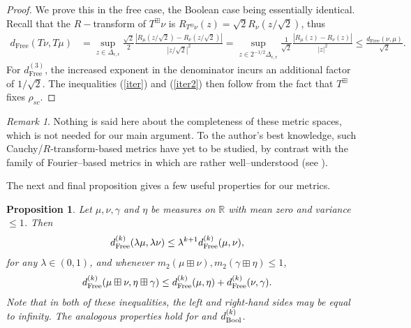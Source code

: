 \documentclass{amsart}
\newtheorem{proposition}[theorem]{Proposition}
\theoremstyle{definition}
\theoremstyle{remark}
\newtheorem{remark}[theorem]{Remark}
\numberwithin{equation}{section}
\begin{document}
\begin{proof} We prove this in the free case, the Boolean case being essentially identical. Recall that the $R-$transform of $T^{\boxplus}\nu$ is $R_{T^{\boxplus}\nu}(z)=\sqrt{2}R_\nu(z/\sqrt{2})$, thus
    \begin{align*}
        d_{\text{Free}}(T\nu, T\mu)&= \sup_{z\in \Delta_{\epsilon,\epsilon}}\frac{\sqrt{2}}{2}\frac{|R_\mu(z/\sqrt{2})-R_\nu(z/\sqrt{2})|}{|z/\sqrt{2}|^2}= \sup_{z\in {2}^{-1/2}\Delta_{\epsilon,\epsilon}}\frac{1}{\sqrt{2}}\frac{|R_\mu(z)-R_\nu(z)|}{|z|^2}\leq\frac{d_{\text{Free}}(\nu, \mu)}{\sqrt{2}}.
    \end{align*}
    For $d^{(3)}_{\text{Free}}$, the increased exponent in the denominator incurs an additional factor of $1/\sqrt{2}$.
    The inequalities (\ref{iter}) and (\ref{iter2}) then follow from the fact that $T^{\boxplus}$ fixes $\rho_{sc}$.
\end{proof}
\begin{remark}
	Nothing is said here about the completeness of these metric spaces, which is not needed for our main argument. To the author's best knowledge, such Cauchy/$R$-transform-based metrics have yet to be studied, by contrast with the family of Fourier--based metrics in \cite{ott} which are rather well--understood (see \cite{jose}). 
\end{remark}
The next and final proposition gives a few useful properties for our metrics. 
\begin{proposition}\label{properties}
    Let $\mu,\nu,\gamma$ and $\eta$ be measures on $\mathbb{R}$ with mean zero and variance $\leq 1$. Then 
    \begin{align}
    d_{\text{\normalfont Free}}^{(k)}(\lambda \mu, \lambda\nu) &\leq \lambda^{k+1}d_{\text{\normalfont Free}}^{(k)}(\mu, \nu),\label{propscale}
\end{align}
for any $\lambda\in (0,1)$, and whenever $m_2(\mu\boxplus\nu),m_2(\gamma\boxplus\eta)\leq 1$,
\begin{align}
    d_{\text{\normalfont Free}}^{(k)}(\mu\boxplus \nu, \eta \boxplus \gamma)&\leq d_{\text{\normalfont Free}}^{(k)}(\mu,\eta)+d_{\text{\normalfont Free}}^{(k)}(\nu, \gamma). \label{propadd}
\end{align}
Note that in both of these inequalities, the left and right-hand sides may be equal to infinity.
The analogous properties hold for and $d^{(k)}_{\text{\normalfont Bool}}$.
\end{proposition}
\end{document}
